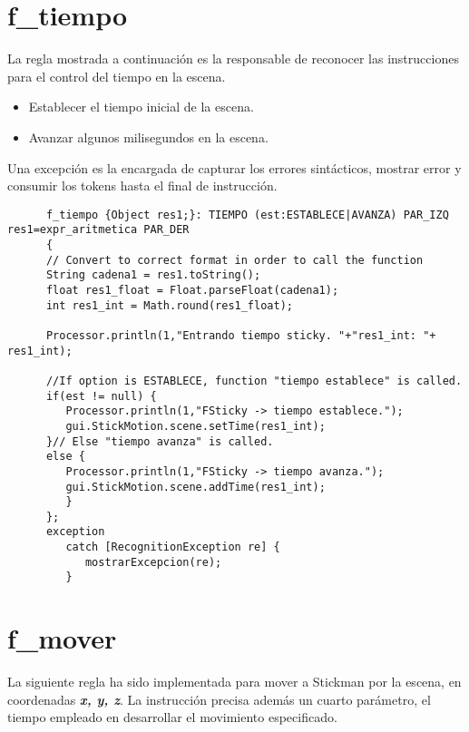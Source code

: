    \section{f\_tiempo}
   La regla mostrada a continuación es la responsable de reconocer las instrucciones para el control del tiempo en la escena.\\
   \begin{itemize}
      \item Establecer el tiempo inicial de la escena.
      \item Avanzar algunos milisegundos en la escena.\\
   \end{itemize}
   Una excepción es la encargada de capturar los errores sintácticos, mostrar error y consumir los tokens hasta el final de instrucción.
   \begin{lstlisting}
      f_tiempo {Object res1;}: TIEMPO (est:ESTABLECE|AVANZA) PAR_IZQ  res1=expr_aritmetica PAR_DER
      {
      // Convert to correct format in order to call the function
      String cadena1 = res1.toString();
      float res1_float = Float.parseFloat(cadena1);
      int res1_int = Math.round(res1_float);

      Processor.println(1,"Entrando tiempo sticky. "+"res1_int: "+ res1_int);

      //If option is ESTABLECE, function "tiempo establece" is called.
      if(est != null) {
         Processor.println(1,"FSticky -> tiempo establece.");
         gui.StickMotion.scene.setTime(res1_int);
      }// Else "tiempo avanza" is called.
      else {
         Processor.println(1,"FSticky -> tiempo avanza.");
         gui.StickMotion.scene.addTime(res1_int);
         }
      };
      exception
         catch [RecognitionException re] {
            mostrarExcepcion(re);
         }
   \end{lstlisting}

   \section{f\_mover}
   La siguiente regla ha sido implementada para mover a Stickman por la escena, en coordenadas \textbf{\textit{x, y, z}}. La instrucción 
   precisa además un cuarto parámetro, el tiempo empleado en desarrollar el movimiento especificado. \\

